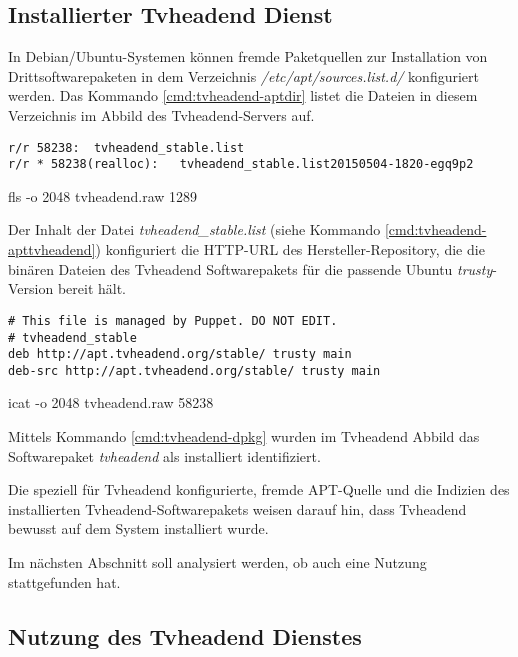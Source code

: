 \subsection{Installierter Tvheadend Dienst}

In Debian/Ubuntu-Systemen können fremde Paketquellen zur Installation von Drittsoftwarepaketen in dem Verzeichnis \textit{/etc/apt/sources.list.d/} konfiguriert werden. Das Kommando \autoref{cmd:tvheadend-aptdir} listet die Dateien in diesem Verzeichnis im Abbild des Tvheadend-Servers auf.

\begin{cmd}[H]
\begin{verbatim}
r/r 58238:	tvheadend_stable.list
r/r * 58238(realloc):	tvheadend_stable.list20150504-1820-egq9p2
\end{verbatim}
\caption{fls -o 2048 tvheadend.raw 1289}
\label{cmd:tvheadend-aptdir}
\end{cmd}

Der Inhalt der Datei \textit{tvheadend\_stable.list} (siehe Kommando \autoref{cmd:tvheadend-apttvheadend}) konfiguriert die HTTP-URL des Hersteller-Repository, die die binären Dateien des Tvheadend Softwarepakets für die passende Ubuntu \textit{trusty}-Version bereit hält.

\begin{cmd}[H]
\begin{verbatim}
# This file is managed by Puppet. DO NOT EDIT.
# tvheadend_stable
deb http://apt.tvheadend.org/stable/ trusty main
deb-src http://apt.tvheadend.org/stable/ trusty main
\end{verbatim}
\caption{icat -o 2048 tvheadend.raw 58238}
\label{cmd:tvheadend-apttvheadend}
\end{cmd}

Mittels Kommando \autoref{cmd:tvheadend-dpkg} wurden im Tvheadend Abbild das Softwarepaket \textit{tvheadend} als installiert identifiziert.

Die speziell für Tvheadend konfigurierte, fremde APT-Quelle und die Indizien des installierten Tvheadend-Softwarepakets weisen darauf hin, dass Tvheadend bewusst auf dem System installiert wurde. 

Im nächsten Abschnitt soll analysiert werden, ob auch eine Nutzung stattgefunden hat.

\subsection{Nutzung des Tvheadend Dienstes}

